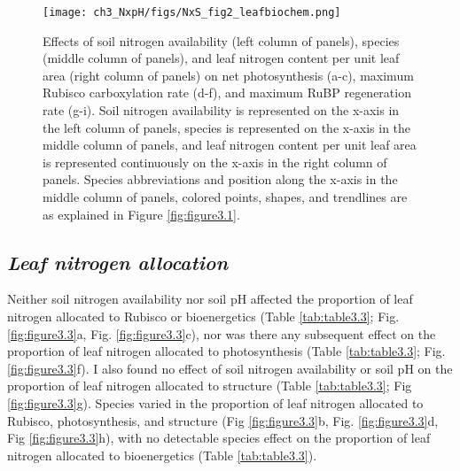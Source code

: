 \newpage
\begin{figure}
    \texttt{[image: ch3\_NxpH/figs/NxS\_fig2\_leafbiochem.png]}
    \centering
    \caption[Effects of soil nitrogen availability, species, and leaf nitrogen content on net photosynthesis, maximum Rubisco carboxylation rate, and maximum RuBP regeneration rate]{Effects of soil nitrogen availability (left column of panels), species (middle column of panels), and leaf nitrogen content per unit leaf area (right column of panels) on net photosynthesis (a-c), maximum Rubisco carboxylation rate (d-f), and maximum RuBP regeneration rate (g-i). Soil nitrogen availability is represented on the x-axis in the left column of panels, species is represented on the x-axis in the middle column of panels, and leaf nitrogen content per unit leaf area is represented continuously on the x-axis in the right column of panels. Species abbreviations and position along the x-axis in the middle column of panels, colored points, shapes, and trendlines are as explained in Figure \ref{fig:figure3.1}.}
    \label{fig:figure3.2}
\end{figure}
\clearpage

\newpage
\subsection{\textit{Leaf nitrogen allocation}}
\noindent Neither soil nitrogen availability nor soil pH affected the proportion of leaf nitrogen allocated to Rubisco or bioenergetics (Table \ref{tab:table3.3}; Fig. \ref{fig:figure3.3}a, Fig. \ref{fig:figure3.3}c), nor was there any subsequent effect on the proportion of leaf nitrogen allocated to photosynthesis (Table \ref{tab:table3.3}; Fig. \ref{fig:figure3.3}f). I also found no effect of soil nitrogen availability or soil pH on the proportion of leaf nitrogen allocated to structure (Table \ref{tab:table3.3}; Fig \ref{fig:figure3.3}g). Species varied in the proportion of leaf nitrogen allocated to Rubisco, photosynthesis, and structure (Fig \ref{fig:figure3.3}b, Fig. \ref{fig:figure3.3}d, Fig \ref{fig:figure3.3}h), with no detectable species effect on the proportion of leaf nitrogen allocated to bioenergetics (Table \ref{tab:table3.3}).
\clearpage

